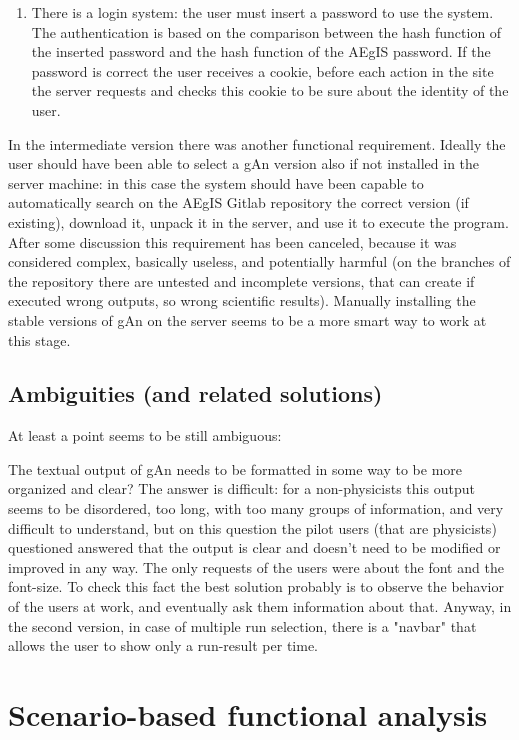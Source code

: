 \begin{enumerate}
\item There is a login system: the user must insert a password to use the system. The authentication is based on the comparison between the hash function of the inserted password and the hash function of the AEgIS password. If the password is correct the user receives a cookie, before each action in the site the server requests and checks this cookie to be sure about the identity of the user.  

\end{enumerate}

In the intermediate version there was another functional requirement. Ideally the user should have been able to select a gAn version also if not installed in the server machine: in this case the system should have been capable to automatically search on the AEgIS Gitlab repository the correct version (if existing), download it, unpack it in the server, and use it to execute the program. 
After some discussion this requirement has been canceled, because it was considered complex, basically useless, and potentially harmful (on the branches of the repository there are untested and incomplete versions, that can create if executed wrong outputs, so wrong scientific results). Manually installing the stable versions of gAn on the server seems to be a more smart way to work at this stage.


\subsection{Ambiguities (and related solutions)}

At least a point seems to be still ambiguous: 

The textual output of gAn needs to be formatted in some way to be more organized and clear? 
The answer is difficult: for a non-physicists this output seems to be disordered, too long, with too many groups of information, and very difficult to understand, but on this question the pilot users (that are physicists) questioned answered that the output is clear and doesn't need to be modified or improved in any way. The only requests of the users were about the font and the font-size. To check this fact the best solution probably is to observe the behavior of the users at work, and eventually ask them information about that.
Anyway, in the second version, in case of multiple run selection, there is a "navbar" that allows the user to show only a run-result per time.


\section{Scenario-based functional analysis}

